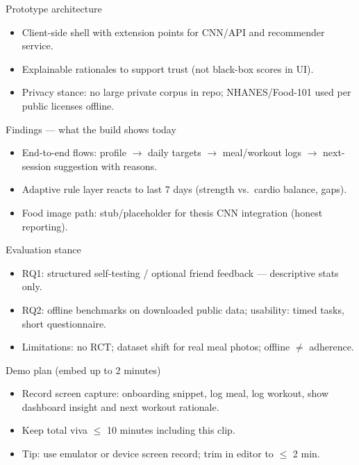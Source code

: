 \documentclass[aspectratio=169,11pt]{beamer}
\begin{document}
\begin{frame}{Prototype architecture}
  \begin{itemize}
    \item Client-side shell with extension points for CNN/API and recommender service.
    \item Explainable rationales to support trust (not black-box scores in UI).
    \item Privacy stance: no large private corpus in repo; NHANES/Food-101 used per public licenses offline.
  \end{itemize}
\end{frame}

\begin{frame}{Findings --- what the build shows today}
  \begin{itemize}
    \item End-to-end flows: profile $\rightarrow$ daily targets $\rightarrow$ meal/workout logs $\rightarrow$ next-session suggestion with reasons.
    \item Adaptive rule layer reacts to last 7 days (strength vs.\ cardio balance, gaps).
    \item Food image path: stub/placeholder for thesis CNN integration (honest reporting).
  \end{itemize}
\end{frame}

\begin{frame}{Evaluation stance}
  \begin{itemize}
    \item RQ1: structured self-testing / optional friend feedback --- descriptive stats only.
    \item RQ2: offline benchmarks on downloaded public data; usability: timed tasks, short questionnaire.
    \item Limitations: no RCT; dataset shift for real meal photos; offline $\neq$ adherence.
  \end{itemize}
\end{frame}

\begin{frame}{Demo plan (embed up to 2 minutes)}
  \begin{itemize}
    \item Record screen capture: onboarding snippet, log meal, log workout, show dashboard insight and next workout rationale.
    \item Keep total viva $\leq$ 10 minutes including this clip.
    \item Tip: use emulator or device screen record; trim in editor to $\leq$ 2 min.
  \end{itemize}
\end{frame}
\end{document}
